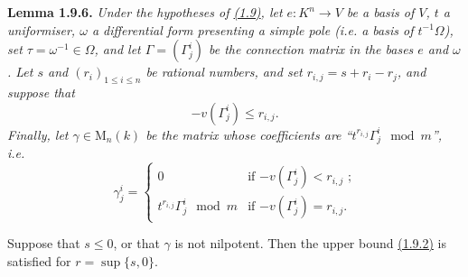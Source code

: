 \documentclass{report}
\newenvironment{itenv}[1]
  {\phantomsection\par\medskip\noindent\textbf{#1.}\itshape}
  {\par\medskip}
\newcommand{\MM}{\mathrm{M}}
\renewcommand{\leq}{\leqslant}
\begin{document}
\begin{itenv}{Lemma 1.9.6}
\label{II.1.9.6}
  Under the hypotheses of \hyperref[II.1.9]{(1.9)}, let $e\colon K^n\to V$ be a basis of $V$, $t$ a uniformiser, $\omega$ a differential form presenting a simple pole (i.e. a basis of $t^{-1}\Omega$), set $\tau=\omega^{-1}\in\Omega$, and let $\Gamma=(\Gamma_j^i)$ be the connection matrix in the bases $e$ and $\omega$.
  Let $s$ and $(r_i)_{1\leq i\leq n}$ be rational numbers, and set $r_{i,j}=s+r_i-r_j$, and suppose that
  \[
    -v(\Gamma_j^i) \leq r_{i,j}.
  \]
  Finally, let $\gamma\in \MM_n(k)$ be the matrix whose coefficients are ``$t^{r_{i,j}}\Gamma_j^i\mod m$'', i.e.
  \[
    \gamma_j^i =
    \begin{cases}
      0 & \mbox{if $-v(\Gamma_j^i)<r_{i,j}$ ;}
    \\t^{r_{i,j}}\Gamma_j^i\mod m & \mbox{if $-v(\Gamma_j^i)=r_{i,j}$.}
    \end{cases}
  \]

  Suppose that $s\leq0$, or that $\gamma$ is not nilpotent.
  Then the upper bound \hyperref[II.1.9.2]{(1.9.2)} is satisfied for $r=\sup\{s,0\}$.
\end{itenv}
\end{document}

